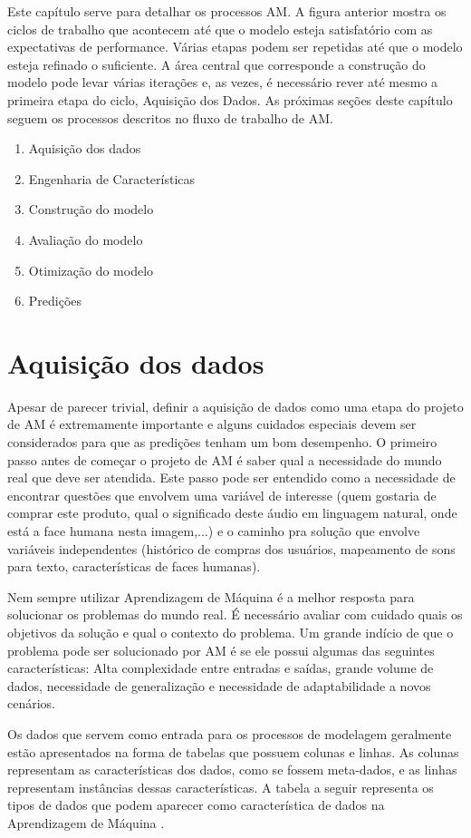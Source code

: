 Este capítulo serve para detalhar os processos AM. A figura anterior mostra os ciclos de trabalho que acontecem até que o modelo esteja satisfatório com as expectativas de performance. Várias etapas podem ser repetidas até que o modelo esteja refinado o suficiente. A área central que corresponde a construção do modelo pode levar várias iterações e, as vezes, é necessário rever até mesmo a primeira etapa do ciclo, Aquisição dos Dados. As próximas seções deste capítulo seguem os processos descritos no fluxo de trabalho de AM.

\begin{enumerate}
\item Aquisição dos dados
\item Engenharia de Características
\item Construção do modelo
\item Avaliação do modelo
\item Otimização do modelo
\item Predições
\end{enumerate}

\section{Aquisição dos dados}
Apesar de parecer trivial, definir a aquisição de dados como uma etapa do projeto de AM é extremamente importante e alguns cuidados especiais devem ser considerados para que as predições tenham um bom desempenho. O primeiro passo antes de começar o projeto de AM é saber qual a necessidade do mundo real que deve ser atendida. Este passo pode ser entendido como a necessidade de encontrar questões que envolvem uma variável de interesse (quem gostaria de comprar este produto, qual o significado deste áudio em linguagem natural, onde está a face humana nesta imagem,...) e o caminho pra solução que envolve variáveis independentes (histórico de compras dos usuários, mapeamento de sons para texto, características de faces humanas).

Nem sempre utilizar Aprendizagem de Máquina é a melhor resposta para solucionar os problemas do mundo real. É necessário avaliar com cuidado quais os objetivos da solução e qual o contexto do problema. Um grande indício de que o problema pode ser solucionado por AM é se ele possui algumas das seguintes características: Alta complexidade entre entradas e saídas, grande volume de dados, necessidade de generalização e necessidade de adaptabilidade a novos cenários. 

Os dados que servem como entrada para os processos de modelagem geralmente estão apresentados na forma de tabelas que possuem colunas e linhas. As colunas representam as características dos dados, como se fossem meta-dados, e as linhas representam instâncias dessas características. A tabela a seguir representa os tipos de dados que podem aparecer como característica de dados na Aprendizagem de Máquina \cite{guy2010}.

